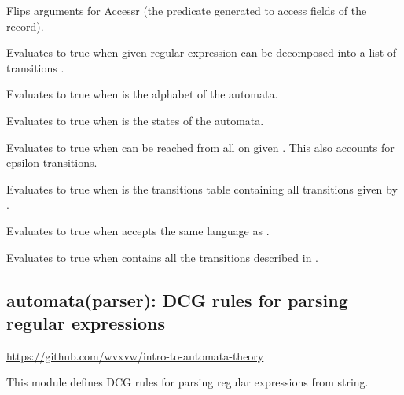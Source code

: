 \begin{description}
Flips arguments for Accessr (the predicate generated to access
fields of the record).

Evaluates to true when given regular expression  can be
decomposed into a list of transitions .

\begin{tags}
\end{tags}

Evaluates to true when  is the alphabet of the  automata.

Evaluates to true when  is the states of the  automata.

Evaluates to true when  can be reached from all 
on given . This also accounts for epsilon transitions.

Evaluates to true when  is the transitions table containing
all transitions given by .

Evaluates to true when  accepts the same language as .

Evaluates to true when  contains all the transitions
described in .
\end{description}

\subsection{automata(parser): DCG rules for parsing regular expressions}

\label{sec:parser}

\begin{tags}
\url{https://github.com/wvxvw/intro-to-automata-theory}
\end{tags}

This module defines DCG rules for parsing regular expressions from
string.\vspace{0.7cm}

